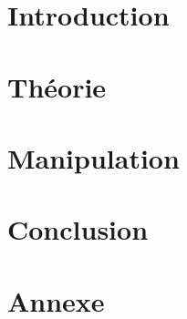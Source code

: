 \documentclass[a4paper,french,twoside,10pt]{report}
\begin{document}
\pagestyle{fancy}

\tableofcontents

\newpage

\section{Introduction}

\newpage


\section{Théorie}

\newpage

\section{Manipulation}

\newpage

\section{Conclusion}


\section{Annexe}

\end{document}
